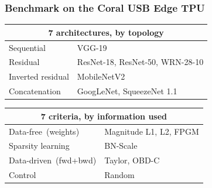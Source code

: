 \begin{frame}
\frametitle{Benchmark on the Coral USB Edge TPU}

\vspace{0.15cm}

\begin{minipage}[t]{0.48\textwidth}\vspace{0pt}
{\scriptsize
\setlength{\tabcolsep}{4pt}
\begin{tabularx}{\linewidth}{@{}l >{\raggedright\arraybackslash}X@{}}
\toprule
\multicolumn{2}{c}{\textbf{7 architectures, by topology}}\\
\midrule
Sequential        & VGG-19 \\
Residual          & ResNet-18, ResNet-50, WRN-28-10 \\
Inverted residual & MobileNetV2 \\
Concatenation     & GoogLeNet, SqueezeNet 1.1 \\
\bottomrule
\end{tabularx}}
\end{minipage}\hfill
\begin{minipage}[t]{0.48\textwidth}\vspace{0pt}
{\scriptsize
\setlength{\tabcolsep}{4pt}
\begin{tabularx}{\linewidth}{@{}l >{\raggedright\arraybackslash}X@{}}
\toprule
\multicolumn{2}{c}{\textbf{7 criteria, by information used}}\\
\midrule
Data-free \,{\tiny(weights)}   & Magnitude L1, L2, FPGM \\
Sparsity learning              & BN-Scale \\
Data-driven \,{\tiny(fwd+bwd)} & Taylor, OBD-C \\
Control                        & Random \\
\bottomrule
\end{tabularx}}
\end{minipage}

\vspace{0.4cm}


\end{frame}
